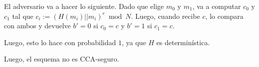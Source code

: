 \documentclass[12pt,addpoints,answers]{exam}
\begin{document}
\begin{questions}
\begin{solution}
  El adversario va a hacer lo siguiente. Dado que elige $m_0$ y $m_1$, va a computar $c_0$ y $c_1$ tal que $c_i := (H(m_i) || m_i)^e \bmod N$. 
  Luego, cuando recibe $c$, lo compara con ambos y devuelve $b'=0$ si $c_0 = c$ y $b'=1$ si $c_1 = c$. 

  Luego, esto lo hace con probabilidad $1$, ya que $H$ es determinística.

  Luego, el esquema no es CCA-seguro. 

\end{solution}



\end{questions}
\end{document}
